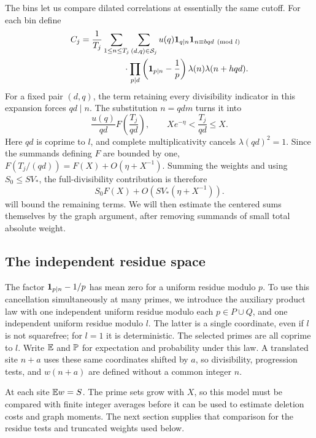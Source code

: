 The bins let us compare dilated correlations at essentially the same
cutoff. For each bin define
\begin{equation}\label{q:centered-average}
\begin{split}
 C_j={}&\frac1{T_j}\sum_{1\le n\le T_j}
 \sum_{(d,q)\in\mathcal S_j}
 u(q)\1_{q\mid n}\1_{n\equiv bqd\pmod l}\\
 &\hspace{13mm}\cdot
 \prod_{p\mid d}\left(\1_{p\mid n}-\frac1p\right)
 \lambda(n)\lambda(n+hqd).
\end{split}
\end{equation}
For a fixed pair $(d,q)$, the term retaining every divisibility indicator
in this expansion forces $qd\mid n$. The substitution $n=qdm$ turns it into
\[
 \frac{u(q)}{qd}F\left(\frac{T_j}{qd}\right),
 \qquad Xe^{-\eta}<\frac{T_j}{qd}\le X.
\]
Here $qd$ is coprime to $l$, and complete multiplicativity cancels
$\lambda(qd)^2=1$. Since the summands defining $F$ are bounded by one,
$F(T_j/(qd))=F(X)+O(\eta+X^{-1})$. Summing the weights and using
$S_0\le SV_*$, the full-divisibility contribution is therefore
\begin{equation}\label{q:full-divisibility}
 S_0F(X)+O(SV_*(\eta+X^{-1})).
\end{equation}
 will bound the remaining terms. We will then estimate
the centered sums themselves by the graph argument, after removing
summands of small total absolute weight.

\subsection{The independent residue space}

The factor $\mathbf 1_{p\mid n}-1/p$ has mean zero for a uniform residue
modulo $p$. To use this cancellation simultaneously at many primes,
we introduce the auxiliary product law with one independent uniform
residue modulo each $p\in P\cup Q$, and one independent uniform residue
modulo $l$. The latter is a single coordinate, even if $l$ is not
squarefree; for $l=1$ it is deterministic. The selected primes are all
coprime to $l$. Write $\mathbb E$ and $\mathbb P$ for expectation and probability
under this law. A translated site $n+a$ uses these same coordinates
shifted by $a$, so divisibility, progression tests, and $w(n+a)$ are
defined without a common integer $n$.

At each site $\mathbb E w=S$. The prime sets grow with $X$, so this model
must be compared with finite integer averages before it can be used to
estimate deletion costs and graph moments. The next section supplies
that comparison for the residue tests and truncated weights used below.
